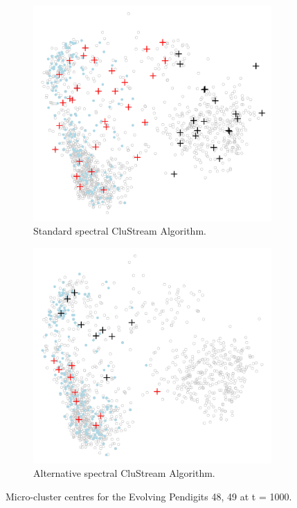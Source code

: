 \begin{figure}[h]
\begin{subfigure}{.5\textwidth}
  \centering
  \includegraphics[width=\textwidth]{evolving_pen/evolving_pen_48_49_100_crop.png}  
  \caption{Standard spectral CluStream Algorithm.}
  \label{fig:stream_1_repeat}
\end{subfigure}
\begin{subfigure}{.5\textwidth}
  \centering
 \includegraphics[width=\textwidth]{evolving_pen/alternative_evolving_pen_48_49_100_crop.png}  
  \caption{Alternative spectral CluStream Algorithm.}
  \label{fig:stream_100_alt}
\end{subfigure}
\caption{Micro-cluster centres for the Evolving Pendigits 48, 49 at t = 1000.}
\label{fig:stream_standard_alt}
\end{figure}


